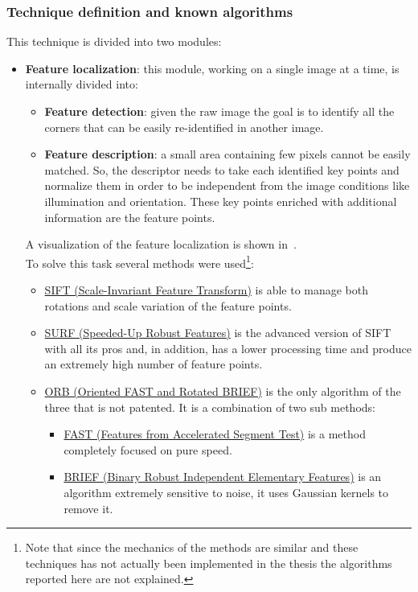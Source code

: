 \subsubsection*{Technique definition and known algorithms}
This technique is divided into two modules:
\begin{itemize}
	\item \textbf{Feature localization}: this module, working on a single image at a time, is internally divided into:
	\begin{itemize}
		\item \textbf{Feature detection}: given the raw image the goal is to identify all the corners that can be easily re-identified in another image.
		\item \textbf{Feature description}: a small area containing few pixels cannot be easily matched. So, the descriptor needs to take each identified key points and normalize them in order to be independent from the image conditions like illumination and orientation. These key points enriched with additional information are the feature points.
	\end{itemize}
	A visualization of the feature localization is shown in~.\\
	To solve this task several methods were used\footnote{Note that since the mechanics of the methods are similar and these techniques has not actually been implemented in the thesis the algorithms reported here are not explained.}:
	\begin{itemize}
		\item \underline{SIFT (Scale-Invariant Feature Transform)}\cite{sift} is able to manage both rotations and scale variation of the feature points.
		\item \underline{SURF (Speeded-Up Robust Features)}\cite{surf} is the advanced version of SIFT with all its pros and, in addition, has a lower processing time and produce an extremely high number of feature points.
		\item \underline{ORB (Oriented FAST and Rotated BRIEF)}\cite{orb} is the only algorithm of the three that is not patented. It is a combination of two sub methods:
		\begin{itemize}[] %
			\item \underline{FAST (Features from Accelerated Segment Test)}\cite{fast} is a method completely focused on pure speed.
			\item \underline{BRIEF (Binary Robust Independent Elementary Features)}\cite{brief} is an algorithm extremely sensitive to noise, it uses Gaussian kernels to remove it.
		\end{itemize}
	\end{itemize}


\end{itemize}
